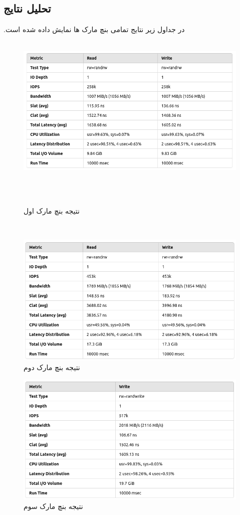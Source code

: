 ‫‫\subsection*{تحلیل نتایج}
‫
‫در جداول زیر نتایج تمامی بنچ مارک ها نمایش داده شده است.
‫
‫\begin{figure}[H]
‫    \centering
‫    \includegraphics[width=\textwidth]{figs/b1.png}
‫    \caption{نتیجه بنچ مارک اول}
‫\end{figure}
‫\begin{figure}[H]
    \centering
    \includegraphics[width=\textwidth]{figs/b2.png}
    \caption{نتیجه بنچ مارک دوم}
\end{figure}
\begin{figure}[H]
    \centering
    \includegraphics[width=\textwidth]{figs/b3.png}
    \caption{نتیجه بنچ مارک سوم}
\end{figure}

